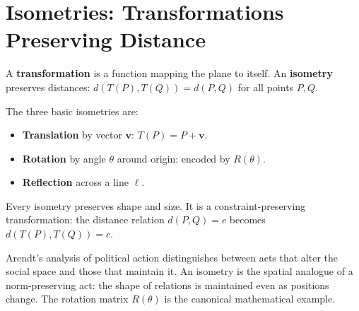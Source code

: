 \documentclass[11pt, openany]{book}
\theoremstyle{plain}
\theoremstyle{definition}
\theoremstyle{remark}
\begin{document}
\section{Isometries: Transformations Preserving Distance}

A \textbf{transformation} is a function mapping the plane to itself. An
\textbf{isometry} preserves distances:
$d(T(P),T(Q))=d(P,Q)$ for all points $P,Q$.

The three basic isometries are:
\begin{itemize}
\item \textbf{Translation} by vector $\mathbf{v}$: $T(P)=P+\mathbf{v}$.
\item \textbf{Rotation} by angle $\theta$ around origin: encoded by $R(\theta)$.
\item \textbf{Reflection} across a line $\ell$.
\end{itemize}

\begin{center}
\end{center}

\begin{principle}
Every isometry preserves shape and size. It is a constraint-preserving
transformation: the distance relation $d(P,Q)=c$ becomes $d(T(P),T(Q))=c$.
\end{principle}

\begin{history}
Arendt's analysis of political action distinguishes between acts that alter
the social space and those that maintain it. An isometry is the spatial analogue
of a norm-preserving act: the shape of relations is maintained even as positions
change. The rotation matrix $R(\theta)$ is the canonical mathematical example.
\end{history}
\end{document}

